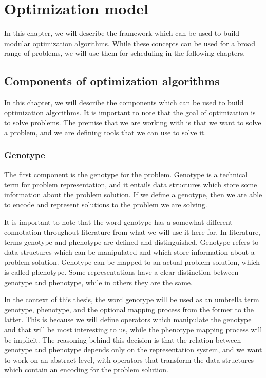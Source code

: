 \chapter{Optimization model}
\label{sec:optimization_model}

In this chapter, we will describe the framework which can be used to build modular optimization algorithms. While these concepts can be used for a broad range of problems, we will use them for scheduling in the following chapters. 

\section{Components of optimization algorithms}
\label{sec:components_of_optimization_algorithms}

In this chapter, we will describe the components which can be used to build optimization algorithms. It is important to note that the goal of optimization is to solve problems. The premise that we are working with is that we want to solve a problem, and we are defining tools that we can use to solve it.

\subsection{Genotype}
\label{sec:genotype}

The first component is the genotype for the problem. Genotype is a technical term for problem representation, and it entails data structures which store some information about the problem solution. If we define a genotype, then we are able to encode and represent solutions to the problem we are solving.

It is important to note that the word genotype has a somewhat different connotation throughout literature from what we will use it here for. In literature, terms genotype and phenotype are defined and distinguished. Genotype refers to data structures which can be manipulated and which store information about a problem solution. Genotype can be mapped to an actual problem solution, which is called phenotype. Some representations have a clear distinction between genotype and phenotype, while in others they are the same.

In the context of this thesis, the word genotype will be used as an umbrella term genotype, phenotype, and the optional mapping process from the former to the latter. This is because we will define operators which manipulate the genotype and that will be most interesting to us, while the phenotype mapping process will be implicit. The reasoning behind this decision is that the relation between genotype and phenotype depends only on the representation system, and we want to work on an abstract level, with operators that transform the data structures which contain an encoding for the problem solution.

